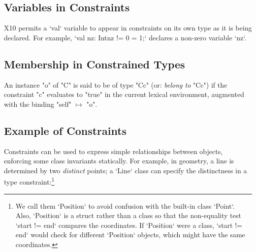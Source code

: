 \subsection{Variables in Constraints}

X10 permits a \xcd`val` variable to appear in constraints on its own type as
it is being declared.  For example, \xcd`val nz: Int{nz != 0} = 1;` declares a
non-zero variable \xcd`nz`.




\subsection{Membership in Constrained Types}

An instance \xcd"o" of \xcd"C" is said to be of type \xcd"C{c}" (or: {\em
belong to} \xcd"C{c}") if the constraint \xcd"c" evaluates to \xcd"true" in
the current lexical environment, augmented with the binding \xcd"self"
$\mapsto$ \xcd"o".



\subsection{Example of Constraints}



Constraints can be used to express simple relationships between objects,
enforcing some class invariants statically.  For example, in geometry, a line
is determined by two {\em distinct} points; a \xcd`Line` class can specify the
distinctness in a type constraint:\footnote{We call them
\xcd`Position` to avoid confusion with the built-in class \xcd`Point`. 
Also, \xcd`Position` is a struct rather than a class so that the non-equality
test \xcd`start != end` compares the coordinates.  If \xcd`Position` were a
class, \xcd`start != end` would check for different \xcd`Position` objects,
which might have the same coordinates.
}



